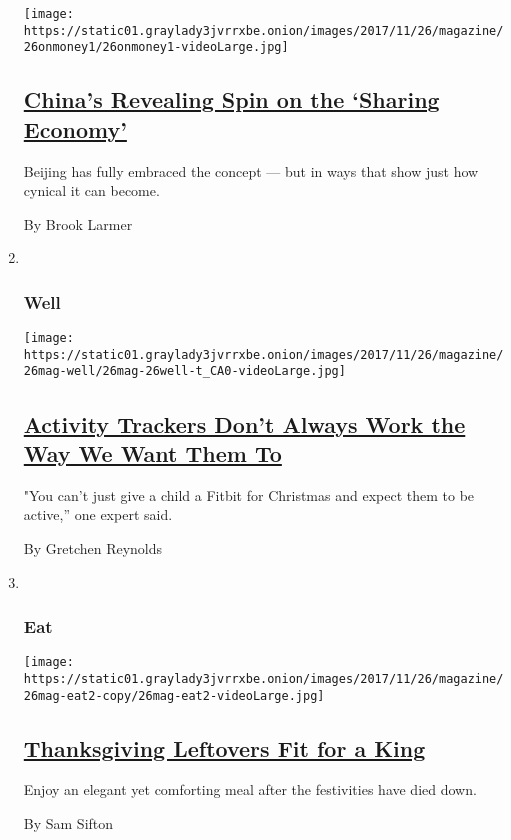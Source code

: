 \begin{enumerate}
  \texttt{[image: https://static01.graylady3jvrrxbe.onion/images/2017/11/26/magazine/26onmoney1/26onmoney1-videoLarge.jpg]}

  \hypertarget{chinas-revealing-spin-on-the-sharing-economy}{%
  \subsection{\texorpdfstring{\href{/2017/11/20/magazine/chinas-revealing-spin-on-the-sharing-economy.html}{China's
  Revealing Spin on the `Sharing
  Economy'}}{China's Revealing Spin on the `Sharing Economy'}}\label{chinas-revealing-spin-on-the-sharing-economy}}

  Beijing has fully embraced the concept --- but in ways that show just
  how cynical it can become.

  By Brook Larmer
\item ~
  \hypertarget{well}{%
  \subsubsection{Well}\label{well}}

  \texttt{[image: https://static01.graylady3jvrrxbe.onion/images/2017/11/26/magazine/26mag-well/26mag-26well-t\_CA0-videoLarge.jpg]}

  \hypertarget{activity-trackers-dont-always-work-the-way-we-want-them-to}{%
  \subsection{\texorpdfstring{\href{/2017/11/21/well/move/activity-monitors-teens-teenagers-adolescents-fitness-motivation.html}{Activity
  Trackers Don't Always Work the Way We Want Them
  To}}{Activity Trackers Don't Always Work the Way We Want Them To}}\label{activity-trackers-dont-always-work-the-way-we-want-them-to}}

  "You can't just give a child a Fitbit for Christmas and expect them to
  be active,'' one expert said.

  By Gretchen Reynolds
\item ~
  \hypertarget{eat}{%
  \subsubsection{Eat}\label{eat}}

  \texttt{[image: https://static01.graylady3jvrrxbe.onion/images/2017/11/26/magazine/26mag-eat2-copy/26mag-eat2-videoLarge.jpg]}

  \hypertarget{thanksgiving-leftovers-fit-for-a-king}{%
  \subsection{\texorpdfstring{\href{/2017/11/22/magazine/thanksgiving-leftovers-fit-for-a-king.html}{Thanksgiving
  Leftovers Fit for a
  King}}{Thanksgiving Leftovers Fit for a King}}\label{thanksgiving-leftovers-fit-for-a-king}}

  Enjoy an elegant yet comforting meal after the festivities have died
  down.

  By Sam Sifton
\end{enumerate}

